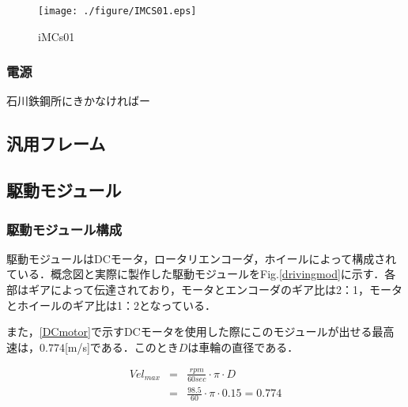 \begin{figure}[hb]
	\centering
	\texttt{[image: ./figure/IMCS01.eps]}
	\caption{iMCs01}
	\label{iMCs01}
\end{figure}

\subsubsection{電源}
石川鉄鋼所にきかなければー
\subsection{汎用フレーム} \label{frame}







\newpage
\subsection{駆動モジュール} \label{module}
\subsubsection{駆動モジュール構成}
\par 駆動モジュールはDCモータ，ロータリエンコーダ，ホイールによって構成されている．概念図と実際に製作した駆動モジュールをFig.\ref{drivingmod}に示す．各部はギアによって伝達されており，モータとエンコーダのギア比は2：1，モータとホイールのギア比は1：2となっている．\\
\par また，\ref{DCmotor}で示すDCモータを使用した際にこのモジュールが出せる最高速は，$0.774$[m/s]である．このとき$D$は車輪の直径である．

\begin{eqnarray}
	Vel_{max}  &=&\frac{rpm}{60sec}\cdot \pi \cdot	D\\ \nonumber
	 &=&\frac{98.5}{60}\cdot \pi \cdot 0.15 = 0.774
\end{eqnarray}

